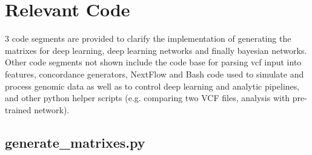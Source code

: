 \documentclass{article}
\begin{document}
\newpage
\section{Relevant Code}
3 code segments are provided to clarify the implementation of generating the matrixes for deep learning, deep learning networks and finally bayesian networks. Other code segments not shown include the code base for parsing vcf input into features, concordance generators, NextFlow and Bash code used to simulate and process genomic data as well as to control deep learning and analytic pipelines, and other python helper scripts (e.g. comparing two VCF files, analysis with pre-trained network).
\subsection{generate\_matrixes.py}
\end{document}

